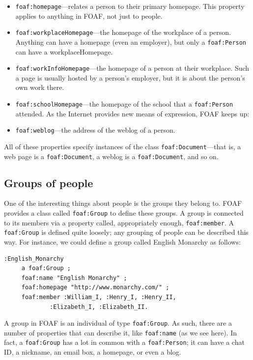 \begin{itemize}
\item \texttt{foaf:homepage}---relates a person to their primary homepage. This
property applies to anything in
FOAF, not just to people.

\item \texttt{foaf:workplaceHomepage}---the homepage of the workplace of a person.
Anything can have a homepage (even an employer), but only a \texttt{foaf:Person}
can have a workplaceHomepage.

\item \texttt{foaf:workInfoHomepage}---the homepage of a person at their workplace.
Such a page is usually
hosted by a person's employer, but it is about the person's own work
there.

\item \texttt{foaf:schoolHomepage}---the homepage of the school that a \texttt{foaf:Person}
attended. As the Internet provides new means of expression, FOAF keeps
up:

\item \texttt{foaf:weblog}---the address of the weblog of a person.
\end{itemize}

All of these properties specify instances of the class
\texttt{foaf:Document}---that is, a web page is a \texttt{foaf:Document}, a weblog is a
\texttt{foaf:Document}, and so on.

\subsection{Groups of people}

One of the interesting things about people is the groups they belong to.
FOAF provides a class called \texttt{foaf:Group} to define these groups. A group
is connected to its members via a property called, appropriately enough,
\texttt{foaf:member}. A \texttt{foaf:Group} is defined quite loosely; any grouping of
people can be described this way. For instance, we could define a group
called English Monarchy as follows:

\begin{lstlisting}
:English_Monarchy
     a foaf:Group ;
     foaf:name "English Monarchy" ;
     foaf:homepage "http://www.monarchy.com/" ;
     foaf:member :William_I, :Henry_I, :Henry_II,
             :Elizabeth_I, :Elizabeth_II.
\end{lstlisting}

A group in FOAF is an individual of type \texttt{foaf:Group}. As such, there are
a number of properties that can describe it, like \texttt{foaf:name} (as we see
here). In fact, a \texttt{foaf:Group} has a lot in common with a \texttt{foaf:Person}; it
can have a chat ID, a nickname, an email box, a homepage, or even a
blog.

